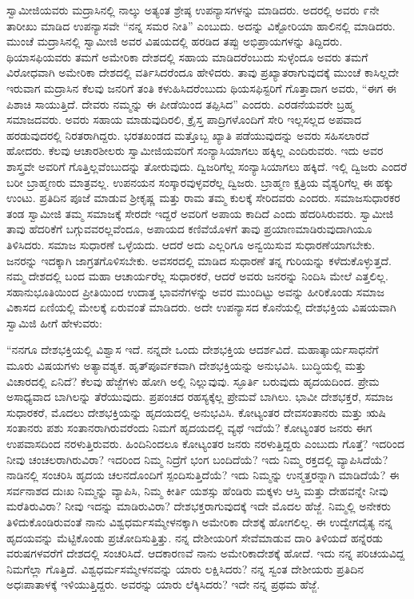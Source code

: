  ಸ್ವಾಮೀಜಿಯವರು ಮದ್ರಾಸಿನಲ್ಲಿ ನಾಲ್ಕು ಅತ್ಯಂತ ಶ್ರೇಷ್ಠ ಉಪನ್ಯಾಸಗಳನ್ನು ಮಾಡಿದರು. ಅದರಲ್ಲಿ ಅವರು ೯ನೇ ತಾರೀಖು ಮಾಡಿದ ಉಪನ್ಯಾಸವೇ “ನನ್ನ ಸಮರ ನೀತಿ” ಎಂಬುದು. ಅದನ್ನು ವಿಕ್ಟೋರಿಯಾ ಹಾಲಿನಲ್ಲಿ ಮಾಡಿದರು. ಮುಂಚೆ ಮದ್ರಾಸಿನಲ್ಲಿ ಸ್ವಾಮೀಜಿ ಅವರ ವಿಷಯದಲ್ಲಿ ಹರಡಿದ ತಪ್ಪು ಅಭಿಪ್ರಾಯಗಳನ್ನು ತಿದ್ದಿದರು. ಥಿಯಾಸಫಿಯವರು ತಮಗೆ ಅಮೇರಿಕಾ ದೇಶದಲ್ಲಿ ಸಹಾಯ ಮಾಡಿದರೆಂಬುದು ಸುಳ್ಳೆಂದೂ ಅವರು ತಮಗೆ ವಿರೋಧವಾಗಿ ಅಮೇರಿಕಾ ದೇಶದಲ್ಲಿ ವರ್ತಿಸಿದರೆಂದೂ ಹೇಳಿದರು. ತಾವು ಪ್ರಖ್ಯಾತರಾಗುವುದಕ್ಕೆ ಮುಂಚೆ ಕಾಸಿಲ್ಲದೇ ಇರುವಾಗ ಮದ್ರಾಸಿನ ಕೆಲವು ಜನರಿಗೆ ತಂತಿ ಕಳುಹಿಸಿದರೆಂಬುದು ಥಿಯಸಫಿಸ್ಟರಿಗೆ ಗೊತ್ತಾದಾಗ ಅವರು, “ಈಗ ಈ ಪಿಶಾಚಿ ಸಾಯುತ್ತಿದೆ. ದೇವರು ನಮ್ಮನ್ನು ಈ ಪೀಡೆಯಿಂದ ತಪ್ಪಿಸಿದ” ಎಂದರು. ಎರಡನೆಯವರೇ ಬ್ರಹ್ಮ ಸಮಾಜದವರು. ಅವರು ಸಹಾಯ ಮಾಡುವುದಿರಲಿ, ಕ್ರೈಸ್ತ ಪಾದ್ರಿಗಳೊಂದಿಗೆ ಸೇರಿ ಇಲ್ಲಸಲ್ಲದ ಅಪವಾದ ಹರಡುವುದರಲ್ಲಿ ನಿರತರಾಗಿದ್ದರು. ಭರತಖಂಡದ ಮತ್ತೊಬ್ಬ ಖ್ಯಾತಿ ಪಡೆಯುವುದನ್ನು ಅವರು ಸಹಿಸಲಾರದೆ ಹೋದರು. ಕೆಲವು ಆಚಾರಶೀಲರು ಸ್ವಾಮೀಜಿಯವರಿಗೆ ಸಂನ್ಯಾಸಿಯಾಗಲು ಹಕ್ಕಿಲ್ಲ ಎಂದಿರುವರು. ಇದು ಅವರ ಶಾಸ್ತ್ರವೇ ಅವರಿಗೆ ಗೊತ್ತಿಲ್ಲವೆಂಬುದನ್ನು ತೋರುವುದು. ದ್ವಿಜರಿಗೆಲ್ಲ ಸಂನ್ಯಾಸಿಯಾಗಲು ಹಕ್ಕಿದೆ. ಇಲ್ಲಿ ದ್ವಿಜರು ಎಂದರೆ ಬರೀ ಬ್ರಾಹ್ಮಣರು ಮಾತ್ರವಲ್ಲ. ಉಪನಯನ ಸಂಸ್ಕಾರವುಳ್ಳವರೆಲ್ಲ ದ್ವಿಜರು. ಬ್ರಾಹ್ಮಣ ಕ್ಷತ್ರಿಯ ವೈಶ್ಯರಿಗೆಲ್ಲ ಈ ಹಕ್ಕು ಉಂಟು. ಪ್ರತಿದಿನ ಪೂಜೆ ಮಾಡುವ ಶ‍್ರೀಕೃಷ್ಣ ಮತ್ತು ರಾಮ ತಮ್ಮ ಕುಲಕ್ಕೆ ಸೇರಿದವರು ಎಂದರು. ಸಮಾಜಸುಧಾರಕರ ತಂಡ ಸ್ವಾಮೀಜಿ ತಮ್ಮ ಸಮಾಜಕ್ಕೆ ಸೇರದೇ ಇದ್ದರೆ ಅವರಿಗೆ ಅಪಾಯ ಕಾದಿದೆ ಎಂದು ಹೆದರಿಸಿರುವರು. ಸ್ವಾಮೀಜಿ ತಾವು ಹೆದರಿಕೆಗೆ ಬಗ್ಗುವವರಲ್ಲವೆಂದೂ, ಅಪಾಯದ ಕಣಿವೆಯೊಳಗೆ ತಾವು ಪ್ರಯಾಣಮಾಡಿರುವುದಾಗಿಯೂ ತಿಳಿಸಿದರು. ಸಮಾಜ ಸುಧಾರಣೆ ಒಳ್ಳೆಯದು. ಆದರೆ ಅದು ಎಲ್ಲರಿಗೂ ಅನ್ವಯಿಸುವ ಸುಧಾರಣೆಯಾಗಬೇಕು. ಜನರನ್ನು ಇದಕ್ಕಾಗಿ ಜಾಗ್ರತಗೊಳಿಸಬೇಕು. ಅವಸರದಲ್ಲಿ ಮಾಡಿದ ಸುಧಾರಣೆ ತನ್ನ ಗುರಿಯನ್ನು ಕಳೆದುಕೊಳ್ಳುತ್ತದೆ. ನಮ್ಮ ದೇಶದಲ್ಲಿ ಬಂದ ಮಹಾ ಆಚಾರ್ಯರೆಲ್ಲ ಸುಧಾರಕರೆ, ಆದರೆ ಅವರು ಜನರನ್ನು ನಿಂದಿಸಿ ಮೇಲೆ ಎತ್ತಲಿಲ್ಲ. ಸಹಾನುಭೂತಿಯಿಂದ ಪ್ರೀತಿಯಿಂದ ಉದಾತ್ತ ಭಾವನೆಗಳನ್ನು ಅವರ ಮುಂದಿಟ್ಟು ಅವನ್ನು ಹೀರಿಕೊಂಡು ಸಮಾಜ ವಿಕಾಸದ ಏಣಿಯಲ್ಲಿ ಮೇಲಕ್ಕೆ ಏರುವಂತೆ ಮಾಡಿದರು. ಅದೇ ಉಪನ್ಯಾಸದ ಕೊನೆಯಲ್ಲಿ ದೇಶಭಕ್ತಿಯ ವಿಷಯವಾಗಿ ಸ್ವಾಮಿಜಿ ಹೀಗೆ ಹೇಳುವರು: 

 “ನನಗೂ ದೇಶಭಕ್ತಿಯಲ್ಲಿ ವಿಶ್ವಾಸ ಇದೆ. ನನ್ನದೇ ಒಂದು ದೇಶಭಕ್ತಿಯ ಆದರ್ಶವಿದೆ. ಮಹಾತ್ಕಾರ್ಯಸಾಧನೆಗೆ ಮೂರು ವಿಷಯಗಳು ಅತ್ಯಾವಶ್ಯಕ. ಹೃತ್‍ಪೂರ್ವಕವಾಗಿ ದೇಶಭಕ್ತಿಯನ್ನು ಅನುಭವಿಸಿ. ಬುದ್ಧಿಯಲ್ಲಿ ಮತ್ತು ವಿಚಾರದಲ್ಲಿ ಏನಿದೆ? ಕೆಲವು ಹೆಜ್ಜೆಗಳು ಹೋಗಿ ಅಲ್ಲಿ ನಿಲ್ಲುವುವು. ಸ್ಫೂರ್ತಿ ಬರುವುದು ಹೃದಯದಿಂದ. ಪ್ರೇಮ ಅಸಾಧ್ಯವಾದ ಬಾಗಿಲನ್ನು ತೆರೆಯುವುದು. ಪ್ರಪಂಚದ ರಹಸ್ಯಕ್ಕೆಲ್ಲ ಪ್ರೇಮವೆ ಬಾಗಿಲು. ಭಾವೀ ದೇಶಭಕ್ತರೆ, ಸಮಾಜ ಸುಧಾರಕರೆ, ಮೊದಲು ದೇಶಭಕ್ತಿಯನ್ನು ಹೃದಯದಲ್ಲಿ ಅನುಭವಿಸಿ. ಕೋಟ್ಯಂತರ ದೇವಸಂತಾನರು ಮತ್ತು ಋಷಿ ಸಂತಾನರು ಪಶು ಸಂತಾನರಾಗಿರುವರೆಂದು ನಿಮಗೆ ಹೃದಯದಲ್ಲಿ ವ್ಯಥೆ ಇದೆಯೆ?‌ ಕೋಟ್ಯಂತರ ಜನರು ಈಗ ಉಪವಾಸದಿಂದ ನರಳುತ್ತಿರುವರು. ಹಿಂದಿನಿಂದಲೂ ಕೋಟ್ಯಂತರ ಜನರು ನರಳುತ್ತಿದ್ದರು ಎಂಬುದು ಗೊತ್ತೆ? ಇದರಿಂದ ನೀವು ಚಂಚಲರಾಗಿರುವಿರಾ? ಇದರಿಂದ ನಿಮ್ಮ ನಿದ್ರೆಗೆ ಭಂಗ ಬಂದಿದೆಯೆ? ಇದು ನಿಮ್ಮ ರಕ್ತದಲ್ಲಿ ವ್ಯಾಪಿಸಿದೆಯೆ? ನಾಡಿನಲ್ಲಿ ಸಂಚರಿಸಿ ಹೃದಯ ಚಲನದೊಂದಿಗೆ ಸ್ಪಂದಿಸುತ್ತಿದೆಯೆ? ಇದು ನಿಮ್ಮನ್ನು ಉನ್ಮತ್ತರನ್ನಾಗಿ ಮಾಡಿದೆಯೆ? ಈ ಸರ್ವನಾಶದ ದುಃಖ ನಿಮ್ಮನ್ನು ವ್ಯಾಪಿಸಿ, ನಿಮ್ಮ ಕೀರ್ತಿ ಯಶಸ್ಸು ಹೆಂಡಿರು ಮಕ್ಕಳು ಆಸ್ತಿ ಮತ್ತು ದೇಹವನ್ನೇ ನೀವು ಮರೆತಿರುವಿರಾ? ನೀವು ಇದನ್ನು ಮಾಡಿರುವಿರಾ? ದೇಶಭಕ್ತರಾಗುವುದಕ್ಕೆ ಇದೇ ಮೊದಲ ಹೆಜ್ಜೆ. ನಿಮ್ಮಲ್ಲಿ ಅನೇಕರು ತಿಳಿದುಕೊಂಡಿರುವಂತೆ ನಾನು ವಿಶ್ವಧರ್ಮಸಮ್ಮೇಳನಕ್ಕಾಗಿ ಅಮೇರಿಕಾ ದೇಶಕ್ಕೆ ಹೋಗಲಿಲ್ಲ. ಈ ಉದ್ವೇಗದೈತ್ಯ ನನ್ನ ಹೃದಯವನ್ನು ಮೆಟ್ಟಿಕೊಂಡು ಪ್ರಚೋದಿಸುತ್ತಿತ್ತು. ನನ್ನ ದೇಶೀಯರಿಗೆ ಸೇವೆಮಾಡುವ ದಾರಿ ತಿಳಿಯದೆ ಹನ್ನೆರಡು ವರುಷಗಳವರೆಗೆ ದೇಶದಲ್ಲಿ ಸಂಚರಿಸಿದೆ. ಆದಕಾರಣವೆ ನಾನು ಅಮೇರಿಕಾದೇಶಕ್ಕೆ ಹೋದೆ. ಇದು ನನ್ನ ಪರಿಚಯವಿದ್ದ ನಿಮಗೆಲ್ಲಾ ಗೊತ್ತಿದೆ. ವಿಶ್ವಧರ್ಮಸಮ್ಮೇಳನವನ್ನು ಯಾರು ಲಕ್ಷಿಸಿದರು? ನನ್ನ ಸ್ವಂತ ದೇಶೀಯರು ಪ್ರತಿದಿನ ಅಧಃಪಾತಾಳಕ್ಕೆ ಇಳಿಯುತ್ತಿದ್ದರು. ಅವರನ್ನು ಯಾರು ಲೆಕ್ಕಿಸಿದರು? ಇದೇ ನನ್ನ ಪ್ರಥಮ ಹೆಜ್ಜೆ. 

